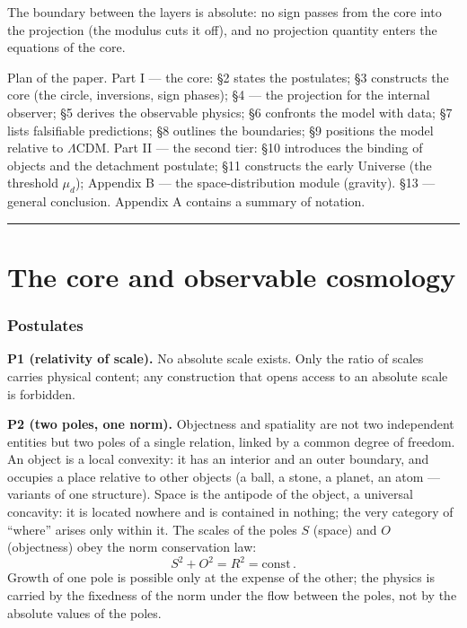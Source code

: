 \documentclass{article}
\begin{document}
The boundary between the layers is absolute: no sign passes from the core into the projection (the modulus cuts it off), and no projection quantity enters the equations of the core.

Plan of the paper. Part I --- the core: \S2 states the postulates; \S3 constructs the core (the circle, inversions, sign phases); \S4 --- the projection for the internal observer; \S5 derives the observable physics; \S6 confronts the model with data; \S7 lists falsifiable predictions; \S8 outlines the boundaries; \S9 positions the model relative to $\Lambda$CDM. Part II --- the second tier: \S10 introduces the binding of objects and the detachment postulate; \S11 constructs the early Universe (the threshold $\mu_d$); Appendix B --- the space-distribution module (gravity). \S13 --- general conclusion. Appendix A contains a summary of notation.

\bigskip
\hrule
\bigskip

\newpage
\part{The core and observable cosmology}
\section{Postulates}

\noindent\textbf{P1 (relativity of scale).} No absolute scale exists. Only the ratio of scales carries physical content; any construction that opens access to an absolute scale is forbidden.

\medskip
\noindent\textbf{P2 (two poles, one norm).} Objectness and spatiality are not two independent entities but two poles of a single relation, linked by a common degree of freedom. An object is a local convexity: it has an interior and an outer boundary, and occupies a place relative to other objects (a ball, a stone, a planet, an atom --- variants of one structure). Space is the antipode of the object, a universal concavity: it is located nowhere and is contained in nothing; the very category of ``where'' arises only within it. The scales of the poles $S$ (space) and $O$ (objectness) obey the norm conservation law:
\begin{equation}
S^2 + O^2 = R^2 = \text{const}\,.
\end{equation}
Growth of one pole is possible only at the expense of the other; the physics is carried by the fixedness of the norm under the flow between the poles, not by the absolute values of the poles.
\end{document}
